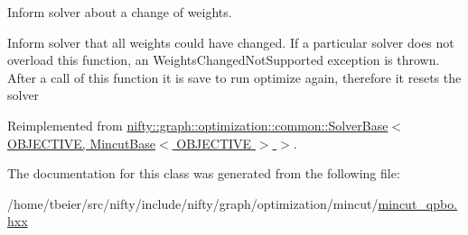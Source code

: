 Inform solver about a change of weights. 

Inform solver that all weights could have changed. If a particular solver does not overload this function, an Weights\+Changed\+Not\+Supported exception is thrown. After a call of this function it is save to run optimize again, therefore it resets the solver 

Reimplemented from \hyperlink{classnifty_1_1graph_1_1optimization_1_1common_1_1SolverBase_a8ab38d61068370e24cca475ef1b5d8b1}{nifty\+::graph\+::optimization\+::common\+::\+Solver\+Base$<$ O\+B\+J\+E\+C\+T\+I\+V\+E, Mincut\+Base$<$ O\+B\+J\+E\+C\+T\+I\+V\+E $>$ $>$}.



The documentation for this class was generated from the following file\+:\begin{DoxyCompactItemize}
\item 
/home/tbeier/src/nifty/include/nifty/graph/optimization/mincut/\hyperlink{mincut__qpbo_8hxx}{mincut\+\_\+qpbo.\+hxx}\end{DoxyCompactItemize}
